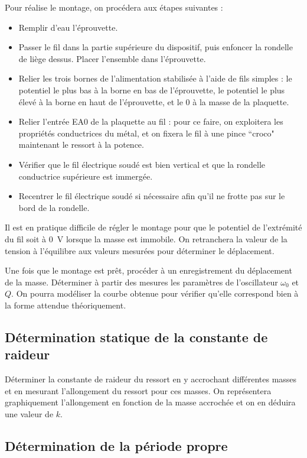 \documentclass{tp}
\begin{document}
Pour réalise le montage, on procédera aux étapes suivantes :
\begin{itemize}
  \item Remplir d'eau l'éprouvette.
  \item Passer le fil dans la partie supérieure du dispositif, puis enfoncer la rondelle de liège dessus. Placer l'ensemble dans l'éprouvette.
  \item Relier les trois bornes de l'alimentation stabilisée à l'aide de fils simples : le potentiel le plus bas à la borne en bas de l'éprouvette, le potentiel le plus élevé à la borne en haut de l'éprouvette, et le $0$ à la masse de la plaquette.
  \item Relier l'entrée EA0 de la plaquette au fil : pour ce faire, on exploitera les propriétés conductrices du métal, et on fixera le fil à une pince ``croco" maintenant le ressort à la potence.
  \item Vérifier que le fil électrique soudé est bien vertical et que la rondelle conductrice supérieure est immergée.
  \item Recentrer le fil électrique soudé si nécessaire afin qu'il ne frotte pas sur le bord de la rondelle.
\end{itemize}

Il est en pratique difficile de régler le montage pour que le potentiel de l'extrémité du fil soit à \SI{0}{V} lorsque la masse est immobile. On retranchera la valeur de la tension à l'équilibre aux valeurs mesurées pour déterminer le déplacement.

Une fois que le montage est prêt, procéder à un enregistrement du déplacement de la masse. Déterminer à partir des mesures les paramètres de l'oscillateur $\omega_0$ et $Q$. On pourra modéliser la courbe obtenue pour vérifier qu'elle correspond bien à la forme attendue théoriquement.

\subsection{Détermination statique de la constante de raideur}%
\label{sub:determination_statique_de_la_constante_de_raideur}

Déterminer la constante de raideur du ressort en y accrochant différentes masses et en mesurant l'allongement du ressort pour ces masses. On représentera graphiquement l'allongement en fonction de la masse accrochée et on en déduira une valeur de $k$. 

\subsection{Détermination de la période propre}%
\label{sub:determination_de_la_periode_propre}
\end{document}
